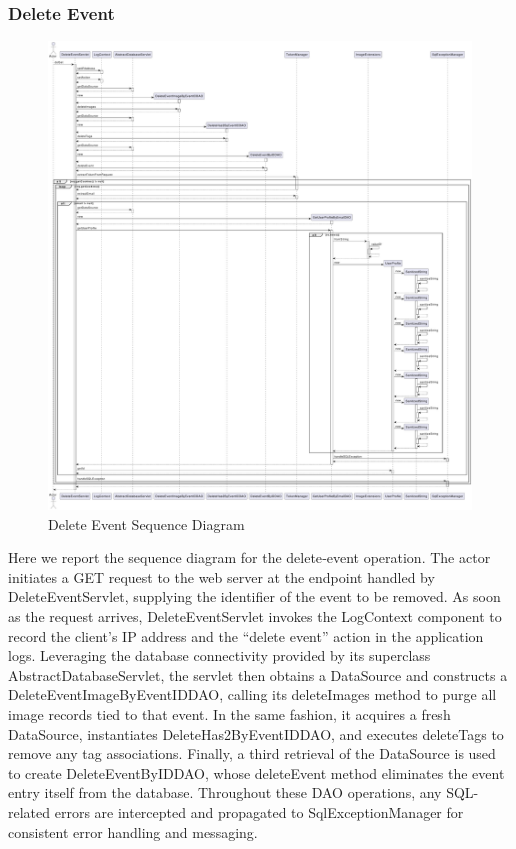 \subsubsection{Delete Event}
\begin{figure}[H]
    \centering
    \includegraphics[width=\textwidth]{images/sequence_diagrams/DeleteEvent.pdf}
    \caption{Delete Event Sequence Diagram}
\end{figure}

Here we report the sequence diagram for the delete‑event operation. The actor initiates a GET request to the web server at the endpoint handled by DeleteEventServlet, supplying the identifier of the event to be removed. As soon as the request arrives, DeleteEventServlet invokes the LogContext component to record the client’s IP address and the “delete event” action in the application logs. Leveraging the database connectivity provided by its superclass AbstractDatabaseServlet, the servlet then obtains a DataSource and constructs a DeleteEventImageByEventIDDAO, calling its deleteImages method to purge all image records tied to that event. In the same fashion, it acquires a fresh DataSource, instantiates DeleteHas2ByEventIDDAO, and executes deleteTags to remove any tag associations. Finally, a third retrieval of the DataSource is used to create DeleteEventByIDDAO, whose deleteEvent method eliminates the event entry itself from the database. Throughout these DAO operations, any SQL-related errors are intercepted and propagated to SqlExceptionManager for consistent error handling and messaging.


